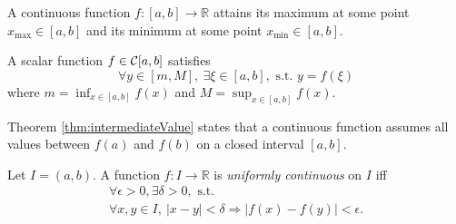 \begin{thm}
  \label{thm:extremeValues}
  A continuous function $f:[a,b]\rightarrow\mathbb{R}$
  attains its maximum at some point \mbox{$x_{\max}\in [a,b]$}
  and its minimum at some point $x_{\min}\in [a,b]$.
\end{thm}

\begin{thm}
  \label{thm:intermediateValue}
  A scalar function $f\in {\cal C}[a,b]$ satisfies
  \begin{equation}
    \label{eq:intermediateValue}
    \forall y\in \left[m, M \right],\ 
    \exists \xi\in[a,b], \text{ s.t. }
    y=f(\xi)
  \end{equation}
  where  $m=\inf_{x\in[a,b]} f(x)$ and
   $M=\sup_{x\in[a,b]} f(x)$.
\end{thm}

\begin{rem}
Theorem \ref{thm:intermediateValue}
 states that a continuous function assumes
 all values between $f(a)$ and $f(b)$
 on a closed interval $[a,b]$.
\end{rem}

\begin{defn}
  \label{def:uniformlyContinuousScalar}
  Let $I=(a,b)$. A function $f: I\rightarrow \mathbb{R}$
  is \emph{uniformly continuous} on $I$
  iff
   \begin{equation}
     \label{eq:uniformlyContinuous}
     \begin{array}{l}
     \forall \epsilon>0, \exists \delta>0,\text{ s.t. }
     \\
     \forall x,y\in I,\ 
     |x-y|<\delta \Rightarrow |f(x)-f(y)|<\epsilon.
     \end{array}
   \end{equation}
\end{defn}

